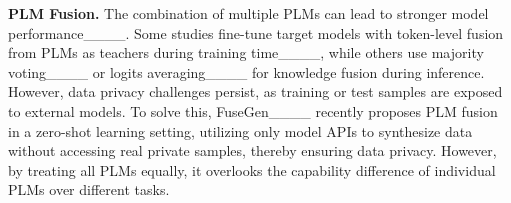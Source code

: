 \textbf{PLM Fusion.} The combination of multiple PLMs can lead to stronger model performance____. Some studies fine-tune target models with token-level fusion from PLMs as teachers during training time____, while others use majority voting____ or logits averaging____ for knowledge fusion during inference. 
However, data privacy challenges persist, as training or test samples are exposed to external models. To solve this, FuseGen____ recently proposes PLM fusion in a zero-shot learning setting, utilizing only model APIs to synthesize data without accessing real private samples, thereby ensuring data privacy. However, by treating all PLMs equally, it overlooks the capability difference of individual PLMs over different tasks.

